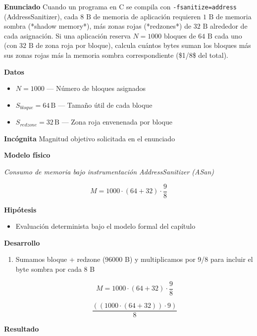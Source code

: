 \documentclass{book}
\begin{document}
\begin{tcolorbox}[title={Problema resuelto}, studiumworked, breakable]

\noindent\textbf{Enunciado}
Cuando un programa en C se compila con \texttt{-fsanitize=address} (AddressSanitizer), cada \(8\text{ B}\) de memoria de aplicación requieren \(1\text{ B}\) de memoria sombra (*shadow memory*), más zonas rojas (*redzones*) de \(32\text{ B}\) alrededor de cada asignación. Si una aplicación reserva \(N = 1000\) bloques de \(64\text{ B}\) cada uno (con \(32\text{ B}\) de zona roja por bloque), calcula cuántos bytes suman los bloques más sus zonas rojas más la memoria sombra correspondiente (\$1/8\$ del total).

\noindent\textbf{Datos}
\begin{itemize}
\item $N = 1000$ — Número de bloques asignados
\item $S_{bloque} = 64\,\mathrm{B}$ — Tamaño útil de cada bloque
\item $S_{redzone} = 32\,\mathrm{B}$ — Zona roja envenenada por bloque
\end{itemize}

\noindent\textbf{Incógnita}
Magnitud objetivo solicitada en el enunciado

\noindent\textbf{Modelo físico}

\noindent\textit{Consumo de memoria bajo instrumentación AddressSanitizer (ASan)}

\[
M = 1000 \cdot (64 + 32) \cdot \frac{9}{8}
\]

\noindent\textbf{Hipótesis}
\begin{itemize}
\item Evaluación determinista bajo el modelo formal del capítulo
\end{itemize}

\noindent\textbf{Desarrollo}
\begin{enumerate}
\item
Sumamos bloque + redzone (96000 B) y multiplicamos por 9/8 para incluir el byte sombra por cada 8 B

\[
M = 1000 \cdot (64 + 32) \cdot \frac{9}{8}
\]

\[
\frac{\left(\left(1000\cdot \left(64+32\right)\right)\cdot 9\right)}{8}
\]
\end{enumerate}

\noindent\textbf{Resultado}


\end{tcolorbox}
\end{document}
